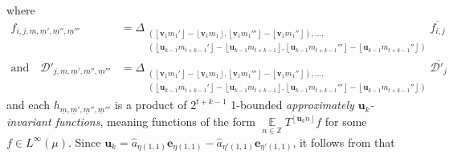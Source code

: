 \documentclass[11pt]{amsart}
\theoremstyle{definition}
\DeclareMathOperator*{\E}{\mathbb{E}}
\newcommand{\Z}{{\mathbb Z}}
\newcommand{\CD}{{\mathcal D}}
\newcommand{\be}{{\mathbf{e}}}
\newcommand{\bu}{{\mathbf{u}}}
\newcommand{\bv}{{\mathbf{v}}}
\newcommand{\um}{{\underline{m}}}
\newcommand{\1}{{\mathbf{1}}}
\newcommand{\floor}[1]{{\left \lfloor #1 \right \rfloor}}
\begin{document}
        where
        \begin{align*}
            f_{i,j,\um,\um',\um'',\um'''} &= \Delta_{\substack{(\floor{\bv_1 m_1'} - \floor{\bv_1 m_1}, \floor{\bv_1 m_1'''} - \floor{\bv_1 m_1''}), \ldots,\\ (\floor{\bu_{k-1} m_{t+k-1}'} - \floor{\bu_{k-1} m_{t+k-1}}, \floor{\bu_{k-1} m_{t+k-1}'''} - \floor{\bu_{k-1} m_{t+k-1}''})}}\overline{f_{i,j}}\\
            \textrm{and}\quad\CD'_{j,\um,\um',\um'',\um'''} &= \Delta_{\substack{(\floor{\bv_1 m_1'} - \floor{\bv_1 m_1}, \floor{\bv_1 m_1'''} - \floor{\bv_1 m_1''}), \ldots,\\ (\floor{\bu_{k-1} m_{t+k-1}'} - \floor{\bu_{k-1} m_{t+k-1}}, \floor{\bu_{k-1} m_{t+k-1}'''} - \floor{\bu_{k-1} m_{t+k-1}''})}}\overline{\CD'_{j}}
        \end{align*}
    and each $h_{\um,\um',\um'',\um'''}$ is a product of $2^{t+k-1}$ 1-bounded \emph{approximately $\bu_k$-invariant functions}, meaning functions of the form $\E\limits_{n\in\Z}T^{\floor{\bu_kn}}f$ for some $f\in L^\infty(\mu)$.
    Since $\bu_k=\hat{a}_{\eta(1,1)}\be_{\eta(1,1)}-\hat{a}_{\eta'(1,1)}\be_{\eta'(1,1)}$, it follows from \cite[Lemma 11.10]{DKKST24} that
\end{document}
